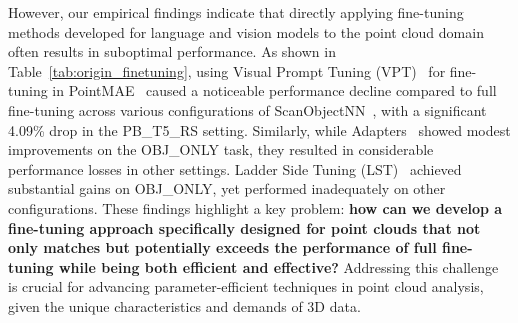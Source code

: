 
However, our empirical findings indicate that directly applying fine-tuning methods developed for language and vision models to the point cloud domain often results in suboptimal performance. As shown in Table~\ref{tab:origin_finetuning}, using Visual Prompt Tuning (VPT)~\cite{jia2022visual} for fine-tuning in PointMAE~\cite{pang2022masked} caused a noticeable performance decline compared to full fine-tuning across various configurations of ScanObjectNN~\cite{uy2019revisiting}, with a significant 4.09\% drop in the PB\_T5\_RS setting. Similarly, while Adapters~\cite{houlsby2019parameter} showed modest improvements on the OBJ\_ONLY task, they resulted in considerable performance losses in other settings. Ladder Side Tuning (LST)~\cite{sung2022lst} achieved substantial gains on OBJ\_ONLY, yet performed inadequately on other configurations. 
These findings highlight a key problem: \textbf{how can we develop a fine-tuning approach specifically designed for point clouds that not only matches but potentially exceeds the performance of full fine-tuning while being both efficient and effective?} Addressing this challenge is crucial for advancing parameter-efficient techniques in point cloud analysis, given the unique characteristics and demands of 3D data.

